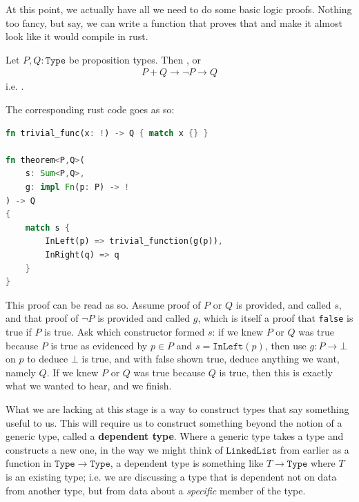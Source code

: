\documentclass[11pt]{article}
\begin{document}
At this point, we actually have all we need to do some basic logic proofs. Nothing too fancy, but say, we can write a function that proves that  and make it almost look like it would compile in rust. 

\begin{theorem}
Let $P,Q \colon \mathtt{Type}$ be proposition types. Then , or \begin{gather*}
P + Q \to \neg P \to Q
\end{gather*}
i.e. .
\end{theorem}

\begin{my proof}
The corresponding rust code goes as so: \begin{lstlisting}[language=Rust]
fn trivial_func(x: !) -> Q { match x {} }

fn theorem<P,Q>(
	s: Sum<P,Q>,
	g: impl Fn(p: P) -> !
) -> Q
{
	match s {
		InLeft(p) => trivial_function(g(p)),
		InRight(q) => q
	}
}
\end{lstlisting}

This proof can be read as so. Assume proof of $P$ or $Q$ is provided, and called $s$, and that proof of $\neg P$ is provided and called $g$, which is itself a proof that \texttt{false} is true if $P$ is true. Ask which constructor formed $s$: if we knew $P$ or $Q$ was true because $P$ is true as evidenced by $p\in P$ and $s = \mathtt{InLeft}(p)$, then use $g \colon P \to \bot$ on $p$ to deduce $\bot$ is true, and with false shown true, deduce anything we want, namely $Q$. If we knew $P$ or $Q$ was true because $Q$ is true, then this is exactly what we wanted to hear, and we finish. 
\end{my proof}

What we are lacking at this stage is a way to construct types that say something useful to us. This will require us to construct something beyond the notion of a generic type, called a \textbf{dependent type}. Where a generic type takes a type and constructs a new one, in the way we might think of $\mathtt{LinkedList}$ from earlier as a function in $\mathtt{Type} \to \mathtt{Type}$, a dependent type is something like $T \to \mathtt{Type}$ where $T$ is an existing type; i.e. we are discussing a type that is dependent not on data from another type, but from data about a \emph{specific} member of the type.
\end{document}
